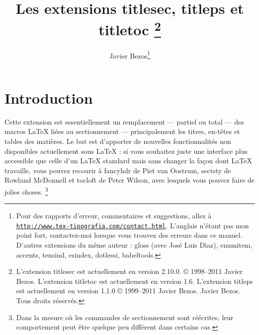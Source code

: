 \documentclass[a4paper]{ltxguide}
\title{Les extensions \textsf{titlesec}, \textsf{titleps} et \textsf{titletoc} 
\footnote{L'extension \textsf{titlesec} est actuellement en version 2.10.0.  
\copyright{} 1998--2011 Javier Bezos. L'extension \textsf{titletoc} est actuellement 
en version 1.6. L'extension \textsf{titleps} est actuellement en version 1.1.0  
\copyright{} 1999--2011 Javier Bezos.  Javier Bezos. Tous droits réservés.}}
\author{Javier Bezos\footnote{Pour des rapports d'erreur, commentaires et 
suggestions, allez à \href{http://www.tex-tipografia.com/contact.html}%
{\texttt{http://www.tex-tipografia.com/contact.html}}.  L'anglais n'étant pas mon 
point fort, contactez-moi lorsque vous trouvez des erreurs dans ce manuel.  
D'autres extensions du même auteur : \textsf{gloss} (avec
Jos\'e Luis D\'{\i}az), \textsf{enumitem, accents, tensind, esindex,
dotlessi, babeltools}.}}
\date{\docdate}
\begin{document}
\maketitle
\tableofcontents
\section{Introduction}

Cette extension est essentiellement un remplacement --- partiel ou total --- des 
macros \LaTeX{} liées au sectionnement ---  principalement les titres, en-têtes et 
tables des matières. Le but est d'apporter de nouvelles fonctionnalités non disponibles 
actuellement sous \LaTeX{} : si vous souhaitez juste une interface plus accessible 
que celle d'un \LaTeX{} standard mais sans changer la façon dont \LaTeX{} travaille, 
vous pouvez recourir à \textsf{fancyhdr} de Piet van Oostrum, \textsf{sectsty} de 
Rowland McDonnell et \textsf{tocloft} de Peter Wilson, avec lesquels vous pouvez 
faire de jolies choses. \footnote{Dans la mesure où les commandes de sectionnement 
sont réécrites, leur comportement peut être quelque peu différent dans certains 
cas.}
\end{document}
